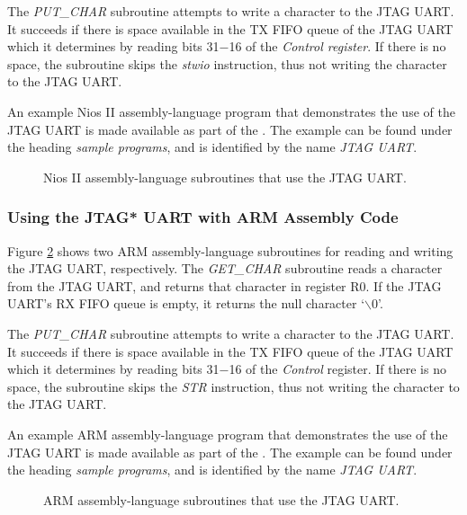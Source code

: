 \documentclass[11pt, twoside, pdftex]{article}
\begin{document}
The \textit{PUT\_CHAR} subroutine attempts to write a character to the JTAG UART. It succeeds if there is space available in the TX FIFO queue of the JTAG UART which it determines by reading bits 31$-$16 of the \textit{Control register}. If there is no space, the subroutine skips the \textit{stwio} instruction, thus not writing the character to the JTAG UART.

An example Nios II assembly-language program that demonstrates the use of the JTAG UART is made available as part of the  
\productNameMed{}. The example can be found under the heading {\it sample programs}, 
and is identified by the name {\it JTAG UART}.

\begin{figure}[h!]

\caption{Nios II assembly-language subroutines that use the JTAG
UART.}
   \label{fig:jtag_uart_nios}
\end{figure}
\pagebreak
\clearpage
\newpage


\subsubsection{Using the JTAG* UART with ARM Assembly Code}

Figure \ref{fig:jtag_uart_arm} shows two ARM assembly-language subroutines for reading and writing the JTAG UART, respectively. 
The \textit{GET\_CHAR} subroutine reads a character from the JTAG UART, and returns that character in register R0. If the JTAG UART's RX FIFO queue is empty, it returns the null character `$\backslash$0'.

The \textit{PUT\_CHAR} subroutine attempts to write a character to the JTAG UART. It succeeds if there is space available in the TX FIFO queue of the JTAG UART which it determines by reading bits 31$-$16 of the \textit{Control} register. If there is no space, the subroutine skips the \textit{STR} instruction, thus not writing the character to the JTAG UART.

An example ARM assembly-language program that demonstrates the use of the JTAG UART is made available as part of the  
\productNameMed{}. The example can be found under the heading {\it sample programs}, 
and is identified by the name {\it JTAG UART}.

\begin{figure}[h!]

\caption{ARM assembly-language subroutines that use the JTAG
UART.}
   \label{fig:jtag_uart_arm}
\end{figure}
\pagebreak
\clearpage
\newpage
\end{document}
